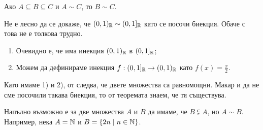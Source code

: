 \begin{cor}
  Ако $A \subseteq B \subseteq C$ и $A \sim C$, то $B \sim C$.
\end{cor}

\begin{example}
  Не е лесно да се докаже, че $(0,1)_{\mathbb{R}} \sim (0,1]_{\mathbb{R}}$ като се посочи биекция.
  Обаче с  това не е толкова трудно.
  \begin{enumerate}[1)]
  \item 
    Очевидно е, че има инекция $(0,1)_{\mathbb{R}}$ в $(0,1]_{\mathbb{R}}$;
  \item
    Можем да дефинираме инекция $f:(0,1]_{\mathbb{R}} \to (0,1)_{\mathbb{R}}$
    като $f(x) = \frac{x}{2}$.    
  \end{enumerate}
  Като имаме 1) и 2), от  следва, че двете множества са равномощни.
  Макар и да не сме посочили такава биекция, то от теоремата знаем, че тя съществува.  
\end{example}


\begin{framed}
\begin{remark}
  Напълно възможно е за две множества $A$ и $B$ да имаме, че  $B \subsetneqq A$, но $A \sim B$.
  Например, нека $A = \mathbb{N}$ и $B = \{2n\mid n\in\mathbb{N}\}$.
\end{remark}
\end{framed}

